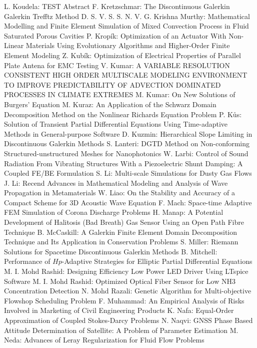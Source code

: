 \documentclass[10pt, A4]{article}%
\begin{document}
{L. Koudela}: {TEST Abstract}
{F. Kretzschmar}: {The Discontinuous Galerkin Galerkin Trefftz Method}
{D. S. V. S. S. N. V. G. Krishna Murthy}: {Mathematical Modelling and Finite Element Simulation of Mixed Convection Process in Fluid Saturated Porous Cavities}
{P. Kropík}: {Optimization of an Actuator With Non-Linear Materials Using Evolutionary Algorithms and Higher-Order Finite Element Modeling}
{Z. Kubík}: {Optimization of Electrical Properties of Parallel Plate Antena for EMC Testing}
{V. Kumar}: {A VARIABLE RESOLUTION CONSISTENT HIGH ORDER MULTISCALE MODELING ENVIRONMENT TO IMPROVE PREDICTABILITY OF ADVECTION DOMINATED PROCESSES IN CLIMATE EXTREMES}
{M. Kumar}: {On New Solutions of Burgers' Equation}
{M. Kuraz}: {An Application of the Schwarz Domain Decomposition Method on the Nonlinear Richards Equation Problem}
{P. Kůs}: {Solution of Transient Partial Differential Equations Using Time-adaptive Methods in General-purpose Software}
{D. Kuzmin}: {Hierarchical Slope Limiting in  Discontinuous Galerkin Methods}
{S. Lanteri}: {DGTD  Method  on  Non-conforming  Structured-unstructured  Meshes  for Nanophotonics}
{W. Larbi}: {Control of Sound Radiation From Vibrating Structures With a Piezoelectric Shunt Damping: A Coupled FE/BE Formulation}
{S. Li}: {Multi-scale Simulations for Dusty Gas Flows}
{J. Li}: {Recend Advances in Mathematical Modeling and Analysis of Wave Propagation in Metamaterials}
{W. Liao}: {On the Stability and Accuracy of a Compact Scheme for 3D Acoustic Wave Equation}
{F. Mach}: {Space-time Adaptive FEM Simulation of Corona Discharge Problems}
{H. Manap}: {A Potential Development of Halitosis (Bad Breath) Gas Sensor Using an Open Path Fibre Technique}
{B. McCaskill}: {A Galerkin Finite Element Domain Decomposition Technique and Its Application in Conservation Problems}
{S. Miller}: {Riemann Solutions for Spacetime Discontinuous Galerkin Methods}
{B. Mitchell}: {Performance of $Hp$-Adaptive Strategies for Elliptic Partial Differential Equations}
{M. I. Mohd Rashid}: {Designing Efficiency Low Power LED Driver Using LTspice Software}
{M. I. Mohd Rashid}: {Optimized Optical Fiber Sensor for Low NH3 Concentration Detection}
{N. Mohd Razali}: {Genetic Algorithm for Multi-objective Flowshop Scheduling Problem}
{F. Muhammad}: {An Empirical Analysis of Risks Involved in Marketing of Civil Engineering Products}
{K. Nafa}: {Equal-Order Approximation of Coupled Stokes-Darcy Problems}
{N. Naqvi}: {GNSS Phase Based Attitude Determination of Satellite: A Problem of Parameter Estimation}
{M. Neda}: {Advances of Leray Regularization for Fluid Flow Problems}
\end{document}

